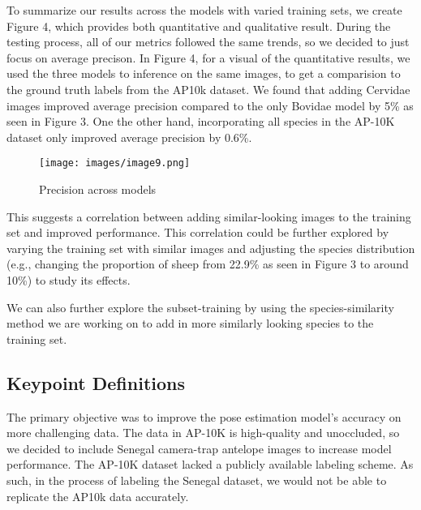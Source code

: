 \documentclass[conference]{IEEEtran}
\begin{document}
To summarize our results across the models with varied training sets, we create Figure 4, which provides both quantitative and qualitative result. During the testing process, all of our metrics followed the same trends, so we decided to just focus on average precison. In Figure 4, for a visual of the quantitative results, we used the three models to inference on the same images, to get a comparision to the ground truth labels from the AP10k\cite{AP10K} dataset.
We found that adding Cervidae images improved average precision compared to the only Bovidae model by 5\% as seen in Figure 3. One the other hand, incorporating all species in the AP-10K \cite{AP10K} dataset only improved average precision by 0.6\%.
\begin{figure}[htbp]
    \centerline{\texttt{[image: images/image9.png]}}
    \caption{Precision across models}
    \label{fig:example}
\end{figure}
This suggests a correlation between adding similar-looking images to the training set and improved performance.
This correlation could be further explored by varying the training set with similar images and adjusting the species distribution (e.g., changing the proportion of sheep from 22.9\% as seen in Figure 3 to around 10\%) to study its effects.

We can also further explore the subset-training by using the species-similarity method we are working on to add in more similarly looking species to the training set.


\subsection{Keypoint Definitions}
The primary objective was to improve the pose estimation model's accuracy on more challenging data.
The data in AP-10K is high-quality and unoccluded, so we decided to include Senegal camera-trap antelope images to increase model performance.
The AP-10K dataset lacked a publicly available labeling scheme. As such, in the process of labeling the Senegal dataset, we would not be able to replicate the AP10k data accurately.
\end{document}
